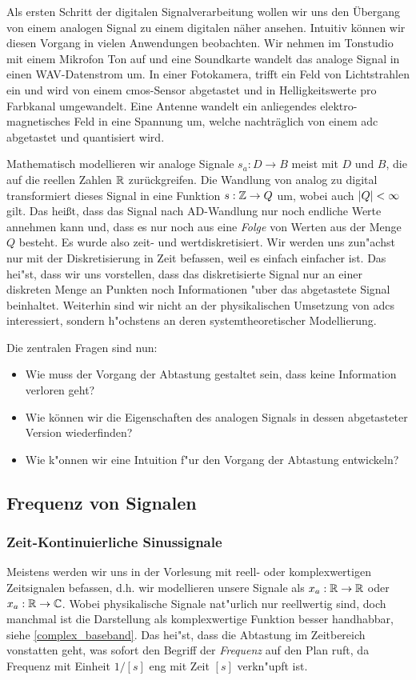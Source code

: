 %
Als ersten Schritt der digitalen Signalverarbeitung wollen wir uns den \"Ubergang von einem analogen Signal zu einem digitalen n\"aher ansehen.
Intuitiv k\"onnen wir diesen Vorgang in vielen Anwendungen beobachten.
Wir nehmen im Tonstudio mit einem Mikrofon Ton auf und eine Soundkarte wandelt das analoge Signal in einen WAV-Datenstrom um.
In einer Fotokamera, trifft ein Feld von Lichtstrahlen ein und wird von einem \gls{cmos}-Sensor  abgetastet und in Helligkeitswerte pro Farbkanal umgewandelt.
Eine Antenne wandelt ein anliegendes elektro-magnetisches Feld in eine Spannung um, welche nachtr\"aglich von einem \gls{adc} abgetastet und quantisiert wird.

Mathematisch modellieren wir analoge Signale $s_a : D \rightarrow B$ meist mit $D$ und $B$, die auf die reellen Zahlen $\mathbb{R}$ zur\"uckgreifen.
Die Wandlung von analog zu digital transformiert dieses Signal in eine Funktion $s: \mathbb{Z} \rightarrow Q$ um, wobei auch ${\left| Q \right|} < \infty$ gilt.
Das hei\ss{}t, dass das Signal nach AD-Wandlung nur noch endliche Werte annehmen kann und, dass es nur noch aus eine \emph{Folge} von Werten aus der Menge $Q$ besteht. 
Es wurde also zeit- und wertdiskretisiert.
Wir werden uns zun"achst nur mit der Diskretisierung in Zeit befassen, weil es einfach einfacher ist.
Das hei"st, dass wir uns vorstellen, dass das diskretisierte Signal nur an einer diskreten Menge an Punkten noch Informationen "uber das abgetastete Signal beinhaltet.
Weiterhin sind wir nicht an der physikalischen Umsetzung von \glspl{adc} interessiert, sondern h"ochstens an deren systemtheoretischer Modellierung.

Die zentralen Fragen sind nun:
\begin{itemize}
    \item Wie muss der Vorgang der Abtastung gestaltet sein, dass keine Information verloren geht?
    \item Wie k\"onnen wir die Eigenschaften des analogen Signals in dessen abgetasteter Version wiederfinden?
    \item Wie k"onnen wir eine Intuition f"ur den Vorgang der Abtastung entwickeln?
\end{itemize}
%
\subsection{Frequenz von Signalen}
%
\subsubsection{Zeit-Kontinuierliche Sinussignale}
%
Meistens werden wir uns in der Vorlesung mit reell- oder komplexwertigen Zeitsignalen befassen, d.h. wir modellieren unsere Signale als $x_a : \mathbb{R} \rightarrow \mathbb{R}$ oder $x_a: \mathbb{R} \rightarrow \mathbb{C}$.
Wobei physikalische Signale nat"urlich nur reellwertig sind, doch manchmal ist die Darstellung als komplexwertige Funktion besser handhabbar, siehe \eqref{complex_baseband}.
Das hei"st, dass die Abtastung im Zeitbereich vonstatten geht, was sofort den Begriff der \emph{Frequenz} auf den Plan ruft, da Frequenz mit Einheit $1/[s]$ eng mit Zeit $[s]$ verkn"upft ist.

